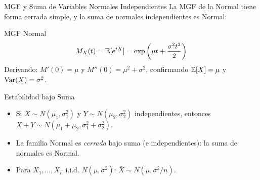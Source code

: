 \documentclass[10pt, aspectratio=169]{beamer}
\begin{document}
\begin{frame}{MGF y Suma de Variables Normales Independientes}
  \footnotesize
  La MGF de la Normal tiene forma cerrada simple, y la suma de normales independientes es Normal: \pause

  \vspace{0.1cm}
  \begin{block}{MGF Normal}
    $$M_{X}(t) = \mathbb{E}[e^{tX}] = \exp\left(\mu t + \dfrac{\sigma^{2} t^{2}}{2}\right)$$
    Derivando: $M'(0) = \mu$ y $M''(0) = \mu^{2} + \sigma^{2}$, confirmando $\mathbb{E}[X] = \mu$ y $\operatorname{Var}(X) = \sigma^{2}$.
  \end{block}

  \vspace{0.1cm}
  \pause
  \begin{alertblock}{Estabilidad bajo Suma}
    \begin{itemize}\itemsep=0.05cm
      \item Si $X \sim N(\mu_{1}, \sigma_{1}^{2})$ y $Y \sim N(\mu_{2}, \sigma_{2}^{2})$ independientes, entonces $X + Y \sim N(\mu_{1} + \mu_{2}, \sigma_{1}^{2} + \sigma_{2}^{2})$.
      \item La familia Normal es \emph{cerrada} bajo suma (e independientes): la suma de normales es Normal.
      \item Para $X_{1}, \dots, X_{n}$ i.i.d. $N(\mu, \sigma^{2})$: $\bar{X} \sim N(\mu, \sigma^{2}/n)$.
    \end{itemize}
  \end{alertblock}
\end{frame}
\end{document}

